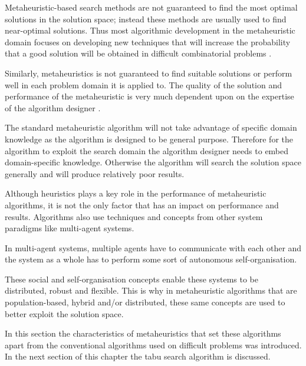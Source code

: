 Metaheuristic-based search methods are not guaranteed to find the most optimal solutions in the solution space; instead these methods are usually used to find near-optimal solutions. Thus most algorithmic development in the metaheuristic domain focuses on developing new techniques that will increase the probability that a good solution will be obtained in difficult combinatorial problems \cite{MetaAgricultural}.

Similarly, metaheuristics is not guaranteed to find suitable solutions or perform well in each problem domain it is applied to. The quality of the solution and performance of the metaheuristic is very much dependent upon on the expertise of the algorithm designer \cite{AutoComplexMeta}. 

The standard metaheuristic algorithm will not take advantage of specific domain knowledge as the algorithm is designed to be general purpose. Therefore for the algorithm to exploit the search domain the algorithm designer needs to embed domain-specific knowledge\cite{AutoComplexMeta,AIModernApproach}. Otherwise the algorithm will search the solution space generally and will produce relatively poor results\cite{AutoComplexMeta,AIModernApproach}.

Although heuristics plays a key role in the performance of metaheuristic algorithms, it is not the only factor that has an impact on performance and results. Algorithms also use techniques and concepts from other system paradigms like multi-agent systems\cite{Self-AdaptiveMeta}. 

In multi-agent systems, multiple agents have to communicate with each other and the system as a whole has to perform some sort of autonomous self-organisation\cite{Self-AdaptiveMeta}.

These social and self-organisation concepts enable these systems to be distributed, robust and flexible. This is why in metaheuristic algorithms that are population-based, hybrid and/or distributed, these same concepts are used to better exploit the solution space\cite{Self-AdaptiveMeta}.

In this section the characteristics of metaheuristics that set these algorithms apart from the conventional algorithms used on difficult problems was introduced. In the next section of this chapter the tabu search algorithm is discussed.

